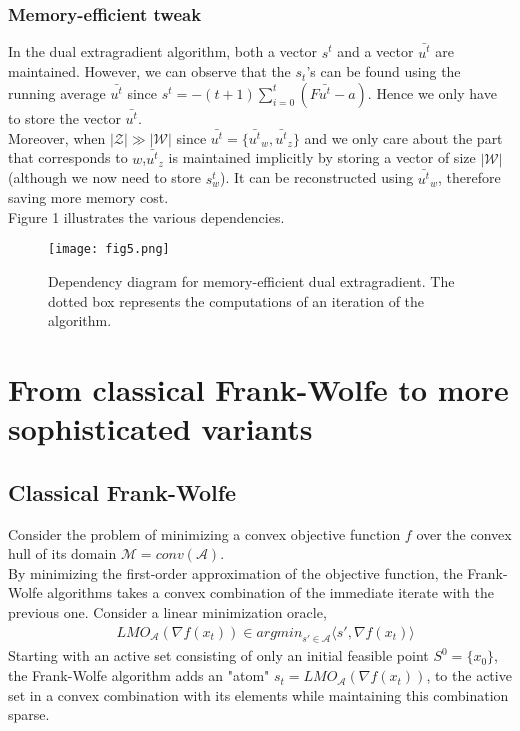 \documentclass{article}
\begin{document}
\subsubsection{Memory-efficient tweak}
In the dual extragradient algorithm, both a vector $s^t$ and a vector
$\bar{u^t}$ are maintained. However, we can observe that the $s_t$'s can be
found using the running average $\bar{u^t}$ since $s^t = -(t + 1 ) \sum_{i=0}^t
(F \bar{u^t} - a)$. Hence we only have to store the vector $\bar{u^t}$.\\
Moreover, when $|\mathcal{Z}| \gg |\mathcal{W}|$ since $\bar{u^t} = \{
\bar{u^t}_w,\bar{u^t}_z \}$ and we only care about the part that corresponds to
$w$,\quad$\bar{u^t}_z$ is maintained implicitly by storing a vector of size
$|\mathcal{W}|$ (although we now need to store $s_w^t$). It can be reconstructed
using $\bar{u^t}_w$, therefore saving more memory cost.\\
Figure 1 illustrates the various dependencies.

\begin{figure}
  \texttt{[image: fig5.png]}
  \caption{Dependency diagram for memory-efficient dual extragradient. The dotted box represents the computations of an iteration of the algorithm.}
  \label{fig:Dependency diagram}
\end{figure}


\section{From classical Frank-Wolfe to more sophisticated variants}
\subsection{Classical Frank-Wolfe}
Consider the problem of minimizing a convex objective function $f$ over the convex hull of its domain $\mathcal{M}= conv(\mathcal{A})$.\\
By minimizing the first-order approximation of the objective function, the Frank-Wolfe algorithms takes a convex combination of the immediate iterate with the previous one. Consider a linear minimization oracle,
\begin{equation*}
\begin{aligned}
    &LMO_{\mathcal{A}}(\nabla f(x_{t}))\in \textit{argmin}_{s\prime\in\mathcal{A}}\langle s\prime, \nabla f(x_{t})\rangle
\end{aligned}    
\end{equation*}
Starting with an active set consisting of only an initial feasible point $S^{0}= \{x_{0}\}$, the Frank-Wolfe algorithm adds an "atom" $s_{t}= LMO_{\mathcal{A}}(\nabla f(x_{t}))$, to the active set in a convex combination with its elements while maintaining this combination sparse.
\end{document}
